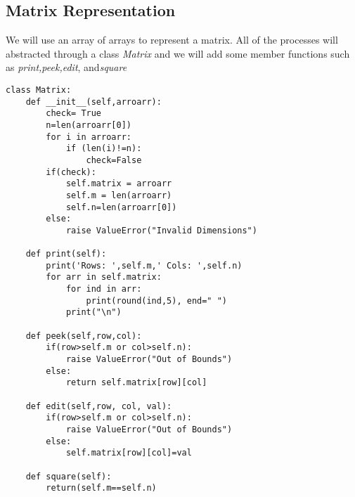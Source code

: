 \subsection{Matrix Representation}
We will use an array of arrays to represent a matrix. 
All of the processes will abstracted through a class \textit{Matrix} and we will add some
member functions such as \textit{print,peek,edit}, and\textit{square}
\begin{lstlisting}
class Matrix:
    def __init__(self,arroarr):
        check= True
        n=len(arroarr[0])
        for i in arroarr:
            if (len(i)!=n):
                check=False
        if(check):
            self.matrix = arroarr
            self.m = len(arroarr)
            self.n=len(arroarr[0])
        else:
            raise ValueError("Invalid Dimensions")

    def print(self):
        print('Rows: ',self.m,' Cols: ',self.n)
        for arr in self.matrix:
            for ind in arr:
                print(round(ind,5), end=" ")
            print("\n")

    def peek(self,row,col):
        if(row>self.m or col>self.n):
            raise ValueError("Out of Bounds")
        else:
            return self.matrix[row][col]

    def edit(self,row, col, val):
        if(row>self.m or col>self.n):
            raise ValueError("Out of Bounds")
        else:
            self.matrix[row][col]=val
    
    def square(self):
        return(self.m==self.n)

\end{lstlisting}
